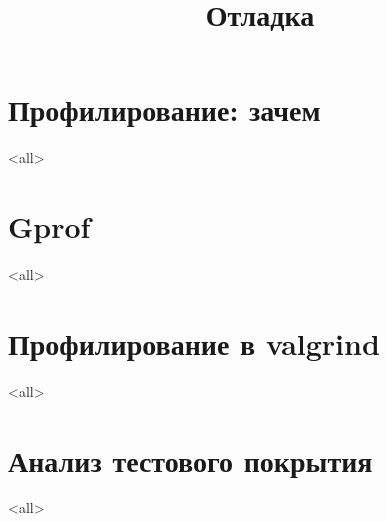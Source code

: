 

\title[Отладка]{Отладка}





\begin{frame}
	\frametitle{}
	\titlepage
	\vspace{-0.5cm}
	\begin{center}
	\end{center}
\end{frame}

\begin{frame}
	\tableofcontents
\end{frame}




\section{Профилирование: зачем}
\mode<all>{}

\section{Gprof}
\mode<all>{}

\section{Профилирование в valgrind}
\mode<all>{}

\section{Анализ тестового покрытия}
\mode<all>{}


